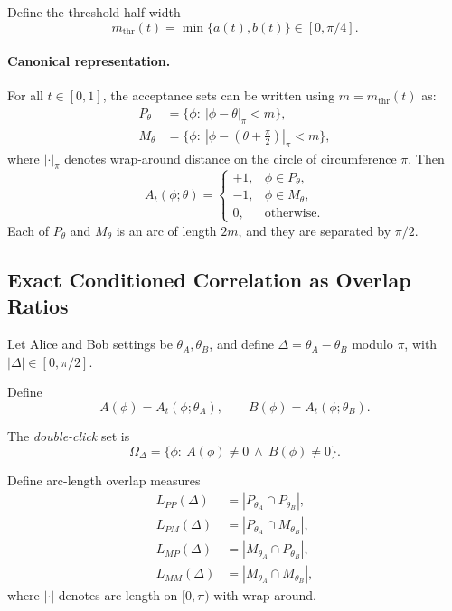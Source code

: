 Define the threshold half-width
\begin{equation}
m_{\mathrm{thr}}(t)=\min\{a(t),b(t)\}\in[0,\pi/4].
\end{equation}

\paragraph{Canonical representation.}
For all $t\in[0,1]$, the acceptance sets can be written using $m=m_{\mathrm{thr}}(t)$ as:
\begin{align}
P_\theta &= \{\phi:\ |\phi-\theta|_\pi < m \},\\
M_\theta &= \{\phi:\ |\phi-(\theta+\tfrac{\pi}{2})|_\pi < m \},
\end{align}
where $|\cdot|_\pi$ denotes wrap-around distance on the circle of circumference $\pi$.
Then
\begin{equation}
A_t(\phi;\theta)=
\begin{cases}
+1, & \phi\in P_\theta,\\
-1, & \phi\in M_\theta,\\
0, & \text{otherwise}.
\end{cases}
\end{equation}
Each of $P_\theta$ and $M_\theta$ is an arc of length $2m$, and they are separated by $\pi/2$.

\subsection{Exact Conditioned Correlation as Overlap Ratios}

Let Alice and Bob settings be $\theta_A,\theta_B$, and define $\Delta=\theta_A-\theta_B$ modulo $\pi$, with $|\Delta|\in[0,\pi/2]$.

Define
\begin{equation}
A(\phi)=A_t(\phi;\theta_A),\qquad B(\phi)=A_t(\phi;\theta_B).
\end{equation}

The \emph{double-click} set is
\begin{equation}
\Omega_{\Delta}=
\{\phi:\ A(\phi)\neq 0 \ \wedge\ B(\phi)\neq 0\}.
\end{equation}

Define arc-length overlap measures
\begin{align}
L_{PP}(\Delta) &= |P_{\theta_A}\cap P_{\theta_B}|,\\
L_{PM}(\Delta) &= |P_{\theta_A}\cap M_{\theta_B}|,\\
L_{MP}(\Delta) &= |M_{\theta_A}\cap P_{\theta_B}|,\\
L_{MM}(\Delta) &= |M_{\theta_A}\cap M_{\theta_B}|,
\end{align}
where $|\cdot|$ denotes arc length on $[0,\pi)$ with wrap-around.

